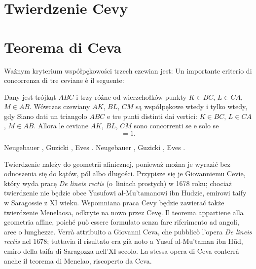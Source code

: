 
%

\section{Twierdzenie Cevy} %
\section{Teorema di Ceva} %

Ważnym kryterium współpękowości trzech czewian jest: %
Un importante criterio di concorrenza di tre ceviane è il seguente: %

\begin{theorem}[Cevy]
\label{twierdzenie_cevy}%
    Dany jest trójkąt $ABC$ i trzy różne od wierzchołków punkty $K \in BC$, $L \in CA$, $M \in AB$. %
    Wówczas czewiany $AK$, $BL$, $CM$ są współpękowe wtedy i tylko wtedy, gdy %
    Siano dati un triangolo $ABC$ e tre punti distinti dai vertici: $K \in BC$, $L \in CA$, $M \in AB$. %
    Allora le ceviane $AK$, $BL$, $CM$ sono concorrenti se e solo se %
    \begin{equation}
        [AMB] [BKC] [CLA] = 1.
    \end{equation}
\end{theorem}

Neugebauer \cite[s. 119]{neugebauer_2018}, Guzicki \cite[s. 87]{guzicki_2021}, Eves \cite[s. 248]{eves1_1972}. %
Neugebauer \cite[p. 119]{neugebauer_2018}, Guzicki \cite[p. 87]{guzicki_2021}, Eves \cite[p. 248]{eves1_1972}. %

Twierdzenie należy do geometrii afinicznej, ponieważ można je wyrazić bez odnoszenia się do kątów, pól albo długości. %
Przypisze się je Giovanniemu Cevie, który wyda pracę \emph{De lineis rectis} (o~liniach prostych) w 1678 roku; chociaż twierdzenie nie będzie obce Yusufowi al-Mu'tamanowi ibn Hudzie, emirowi taify w Saragossie z XI wieku. %
Wspomniana praca Cevy będzie zawierać także twierdzenie Menelaosa, odkryte na nowo przez Cevę. %
Il teorema appartiene alla geometria affine, poiché può essere formulato senza fare riferimento ad angoli, aree o lunghezze. %
Verrà attribuito a Giovanni Ceva, che pubblicò l'opera \emph{De lineis rectis} nel 1678; tuttavia il risultato era già noto a Yusuf al-Mu'taman ibn Hūd, emiro della taifa di Saragozza nell'XI secolo. %
La stessa opera di Ceva conterrà anche il teorema di Menelao, riscoperto da Ceva. %
%
%

